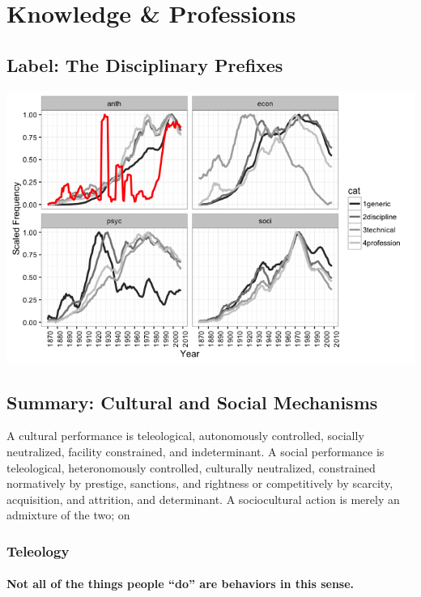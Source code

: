 \documentclass[]{article}
\begin{document}
\section{Knowledge \& Professions}\label{knowledge-professions}

\subsection{Label: The Disciplinary
Prefixes}\label{label-the-disciplinary-prefixes}

\begin{center}\includegraphics{Figs/ch0/disciplines-1} \end{center}

\subsection{Summary: Cultural and Social
Mechanisms}\label{summary-cultural-and-social-mechanisms}

A cultural performance is teleological, autonomously controlled,
socially neutralized, facility constrained, and indeterminant. A social
performance is teleological, heteronomously controlled, culturally
neutralized, constrained normatively by prestige, sanctions, and
rightness or competitively by scarcity, acquisition, and attrition, and
determinant. A sociocultural action is merely an admixture of the two;
on

\subsubsection{Teleology}\label{teleology}

\paragraph{Not all of the things people ``do'' are behaviors in this
sense.}\label{not-all-of-the-things-people-do-are-behaviors-in-this-sense.}
\end{document}
